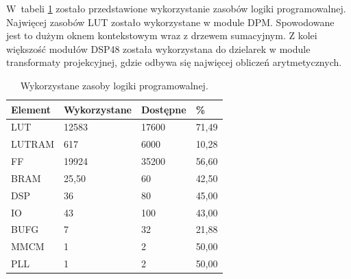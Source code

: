 W~tabeli \ref{tab:fpgautilization} zostało przedstawione wykorzystanie zasobów logiki programowalnej. Najwięcej zasobów LUT zostało wykorzystane w module DPM. Spowodowane jest to dużym oknem kontekstowym wraz z drzewem sumacyjnym. Z kolei większość modułów DSP48 została wykorzystana do dzielarek w module transformaty projekcyjnej, gdzie odbywa się najwięcej obliczeń arytmetycznych.
\begin{table}[]
\centering
\caption{Wykorzystane zasoby logiki programowalnej.}
\label{tab:fpgautilization}
\begin{tabular}{|l|l|l|l|}
\hline
Element & Wykorzystane & Dostępne & \% \\ \hline 
LUT & 12583 & 17600 & 71,49 \\ \hline
LUTRAM & 617 & 6000 & 10,28 \\ \hline
FF & 19924 & 35200 & 56,60 \\ \hline
BRAM & 25,50 & 60 & 42,50 \\ \hline
DSP & 36 & 80 & 45,00 \\ \hline
IO & 43 & 100 & 43,00 \\ \hline
BUFG & 7 & 32 & 21,88 \\ \hline
MMCM & 1 & 2 & 50,00 \\ \hline
PLL & 1 & 2 & 50,00 \\ \hline
\end{tabular}
\end{table}



